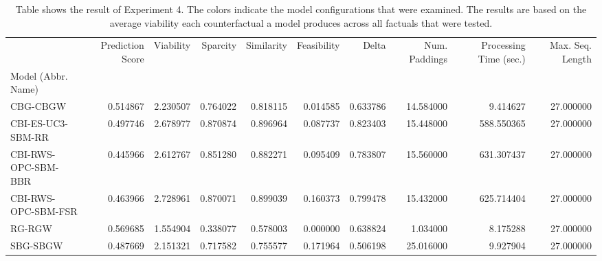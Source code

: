 \begin{table}
\caption{Table shows the result of Experiment 4. The colors indicate the model configurations that were examined. The results are based on the average viability each counterfactual a model produces across all factuals that were tested.}
\label{tbl:exp4-winner}
\begin{tabular}{lrrrrrrrrr}
 & Prediction Score & Viability & Sparcity & Similarity & Feasibility & Delta & Num. Paddings & Processing Time (sec.) & Max. Seq. Length \\
Model (Abbr. Name) &  &  &  &  &  &  &  &  &  \\
CBG-CBGW & 0.514867 & 2.230507 & 0.764022 & 0.818115 & 0.014585 & 0.633786 & 14.584000 & 9.414627 & 27.000000 \\
CBI-ES-UC3-SBM-RR & 0.497746 & 2.678977 & 0.870874 & 0.896964 & 0.087737 & 0.823403 & 15.448000 & 588.550365 & 27.000000 \\
CBI-RWS-OPC-SBM-BBR & 0.445966 & 2.612767 & 0.851280 & 0.882271 & 0.095409 & 0.783807 & 15.560000 & 631.307437 & 27.000000 \\
CBI-RWS-OPC-SBM-FSR & 0.463966 & 2.728961 & 0.870071 & 0.899039 & 0.160373 & 0.799478 & 15.432000 & 625.714404 & 27.000000 \\
RG-RGW & 0.569685 & 1.554904 & 0.338077 & 0.578003 & 0.000000 & 0.638824 & 1.034000 & 8.175288 & 27.000000 \\
SBG-SBGW & 0.487669 & 2.151321 & 0.717582 & 0.755577 & 0.171964 & 0.506198 & 25.016000 & 9.927904 & 27.000000 \\
\end{tabular}
\end{table}
